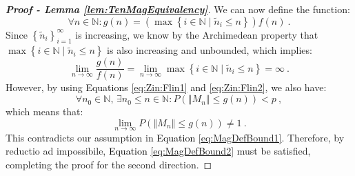 \documentclass{article} %
\begin{document}
\begin{proof}[\textbf{Proof - Lemma \ref{lem:TenMagEquivalency}}]
We can now define the function:
\begin{equation}
\forall n \in \mathbb{N}: g\left(n\right) = \left(\max\left\{ i \in \mathbb{N} \mid \tilde{n}_i \leq n\right\}\right) f\left(n\right) \ .
\label{eq:Zin:Flin2}
\end{equation}
Since \(\left\{ \tilde{n}_i\right\}_{i=1}^{\infty}\) is increasing, we know by the Archimedean property that \(\max\left\{ i \in \mathbb{N} \mid \tilde{n}_i \leq n\right\}\) is also increasing and unbounded, which implies:
\begin{equation}
\lim_{n \rightarrow \infty} \frac{g\left(n\right)}{f\left(n\right)} = \lim_{n \rightarrow \infty} \max\left\{ i \in \mathbb{N} \mid \tilde{n}_i \leq n\right\} = \infty \ .
\end{equation}
However, by using \textcolor{black}{Equations} \ref{eq:Zin:Flin1} \textcolor{black}{and} \ref{eq:Zin:Flin2}, we also have:
\begin{equation}
    \forall n_0 \in \mathbb{N},\, \exists n_0 \leq n \in \mathbb{N}: P\left(\left\Vert M_n\right\Vert \leq g\left(n\right)\right) < p \ ,
\end{equation}
which means that:
\begin{equation}
\lim_{n \rightarrow \infty} P\left(\left\Vert M_n\right\Vert \leq g\left(n\right)\right) \neq 1 \ .
\end{equation}
This contradicts our assumption in \textcolor{black}{Equation} \ref{eq:MagDefBound1}. Therefore, by reductio ad impossibile, \textcolor{black}{Equation} \ref{eq:MagDefBound2} must be satisfied, completing the proof for the second direction.
\end{proof}
\end{document}
